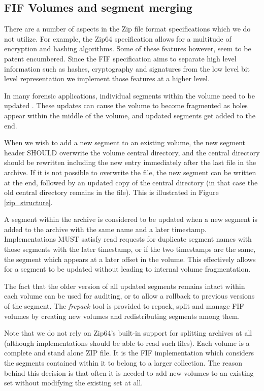 \documentclass[12pt, conference]{IEEEtran}
\begin{document}
\subsection{FIF Volumes and segment merging}
There are a number of aspects in the Zip file format specifications
which we do not utilize. For example, the Zip64 specification allows
for a multitude of encryption and hashing algorithms. Some of these
features however, seem to be patent encumbered. Since the FIF
specification aims to separate high level information such as hashes,
cryptography and signatures from the low level bit level
representation we implement those features at a higher level.

In many forensic applications, individual segments within the volume
need to be updated \cite{AFF}. These updates can cause the volume to
become fragmented as holes appear within the middle of the volume, and
updated segments get added to the end.

When we wish to add a new segment to an existing volume, the new
segment header SHOULD overwrite the volume central directory, and the
central directory should be rewritten including the new entry
immediately after the last file in the archive. If it is not possible
to overwrite the file, the new segment can be written at the end,
followed by an updated copy of the central directory (in that case the
old central directory remains in the file). This is illustrated in
Figure \ref{zip_structure}.

A segment within the archive is considered to be updated when a new
segment is added to the archive with the same name and a later
timestamp. Implementations MUST satisfy read requests for duplicate
segment names with those segments with the later timestamp, or if the
two timestamps are the same, the segment which appears at a later
offset in the volume. This effectively allows for a segment to be
updated without leading to internal volume fragmentation.

The fact that the older version of all updated segments remains intact
within each volume can be used for auditing, or to allow a rollback to
previous versions of the segment. The {\em frepack} tool is provided
to repack, split and manage FIF volumes by creating new volumes and
redistributing segments among them.

Note that we do not rely on Zip64's built-in support for splitting
archives at all (although implementations should be able to read such
files). Each volume is a complete and stand alone ZIP file. It is the
FIF implementation which considers the segments contained within it to
belong to a larger collection. The reason behind this decision is that
often it is needed to add new volumes to an existing set without
modifying the existing set at all.
\end{document}
